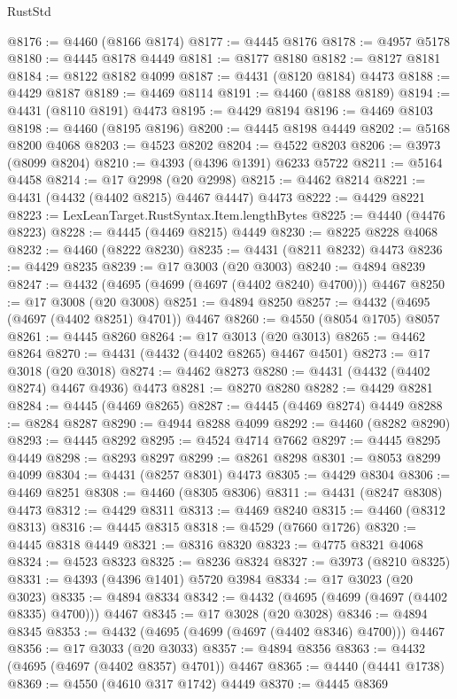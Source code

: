 \begin{lexlean}{RustStd}
\begin{coremodule}
@8176 := @4460 (@8166 @8174)
@8177 := @4445 @8176
@8178 := @4957 @5178
@8180 := @4445 @8178 @4449
@8181 := @8177 @8180
@8182 := @8127 @8181
@8184 := @8122 @8182 @4099
@8187 := @4431 (@8120 @8184) @4473
@8188 := @4429 @8187
@8189 := @4469 @8114
@8191 := @4460 (@8188 @8189)
@8194 := @4431 (@8110 @8191) @4473
@8195 := @4429 @8194
@8196 := @4469 @8103
@8198 := @4460 (@8195 @8196)
@8200 := @4445 @8198 @4449
@8202 := @5168 @8200 @4068
@8203 := @4523 @8202
@8204 := @4522 @8203
@8206 := @3973 (@8099 @8204)
@8210 := @4393 (@4396 @1391) @6233 @5722
@8211 := @5164 @4458
@8214 := @17 @2998 (@20 @2998)
@8215 := @4462 @8214
@8221 := @4431 (@4432 (@4402 @8215) @4467 @4447) @4473
@8222 := @4429 @8221
@8223 := LexLeanTarget.RustSyntax.Item.lengthBytes
@8225 := @4440 (@4476 @8223)
@8228 := @4445 (@4469 @8215) @4449
@8230 := @8225 @8228 @4068
@8232 := @4460 (@8222 @8230)
@8235 := @4431 (@8211 @8232) @4473
@8236 := @4429 @8235
@8239 := @17 @3003 (@20 @3003)
@8240 := @4894 @8239
@8247 := @4432 (@4695 (@4699 (@4697 (@4402 @8240) @4700))) @4467
@8250 := @17 @3008 (@20 @3008)
@8251 := @4894 @8250
@8257 := @4432 (@4695 (@4697 (@4402 @8251) @4701)) @4467
@8260 := @4550 (@8054 @1705) @8057
@8261 := @4445 @8260
@8264 := @17 @3013 (@20 @3013)
@8265 := @4462 @8264
@8270 := @4431 (@4432 (@4402 @8265) @4467 @4501)
@8273 := @17 @3018 (@20 @3018)
@8274 := @4462 @8273
@8280 := @4431 (@4432 (@4402 @8274) @4467 @4936) @4473
@8281 := @8270 @8280
@8282 := @4429 @8281
@8284 := @4445 (@4469 @8265)
@8287 := @4445 (@4469 @8274) @4449
@8288 := @8284 @8287
@8290 := @4944 @8288 @4099
@8292 := @4460 (@8282 @8290)
@8293 := @4445 @8292
@8295 := @4524 @4714 @7662
@8297 := @4445 @8295 @4449
@8298 := @8293 @8297
@8299 := @8261 @8298
@8301 := @8053 @8299 @4099
@8304 := @4431 (@8257 @8301) @4473
@8305 := @4429 @8304
@8306 := @4469 @8251
@8308 := @4460 (@8305 @8306)
@8311 := @4431 (@8247 @8308) @4473
@8312 := @4429 @8311
@8313 := @4469 @8240
@8315 := @4460 (@8312 @8313)
@8316 := @4445 @8315
@8318 := @4529 (@7660 @1726)
@8320 := @4445 @8318 @4449
@8321 := @8316 @8320
@8323 := @4775 @8321 @4068
@8324 := @4523 @8323
@8325 := @8236 @8324
@8327 := @3973 (@8210 @8325)
@8331 := @4393 (@4396 @1401) @5720 @3984
@8334 := @17 @3023 (@20 @3023)
@8335 := @4894 @8334
@8342 := @4432 (@4695 (@4699 (@4697 (@4402 @8335) @4700))) @4467
@8345 := @17 @3028 (@20 @3028)
@8346 := @4894 @8345
@8353 := @4432 (@4695 (@4699 (@4697 (@4402 @8346) @4700))) @4467
@8356 := @17 @3033 (@20 @3033)
@8357 := @4894 @8356
@8363 := @4432 (@4695 (@4697 (@4402 @8357) @4701)) @4467
@8365 := @4440 (@4441 @1738)
@8369 := @4550 (@4610 @317 @1742) @4449
@8370 := @4445 @8369

\end{coremodule}
\end{lexlean}

